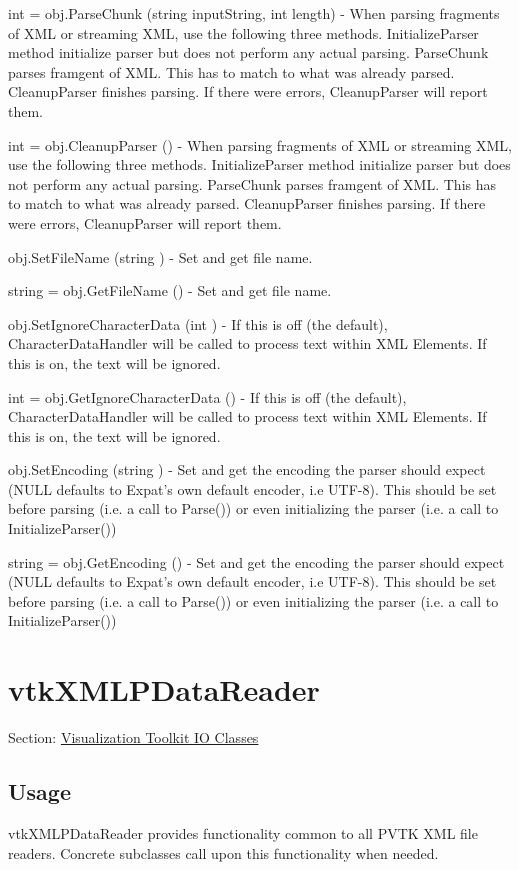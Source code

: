\begin{DoxyItemize}
\item {\ttfamily int = obj.\-Parse\-Chunk (string input\-String, int length)} -\/ When parsing fragments of X\-M\-L or streaming X\-M\-L, use the following three methods. Initialize\-Parser method initialize parser but does not perform any actual parsing. Parse\-Chunk parses framgent of X\-M\-L. This has to match to what was already parsed. Cleanup\-Parser finishes parsing. If there were errors, Cleanup\-Parser will report them.  
\item {\ttfamily int = obj.\-Cleanup\-Parser ()} -\/ When parsing fragments of X\-M\-L or streaming X\-M\-L, use the following three methods. Initialize\-Parser method initialize parser but does not perform any actual parsing. Parse\-Chunk parses framgent of X\-M\-L. This has to match to what was already parsed. Cleanup\-Parser finishes parsing. If there were errors, Cleanup\-Parser will report them.  
\item {\ttfamily obj.\-Set\-File\-Name (string )} -\/ Set and get file name.  
\item {\ttfamily string = obj.\-Get\-File\-Name ()} -\/ Set and get file name.  
\item {\ttfamily obj.\-Set\-Ignore\-Character\-Data (int )} -\/ If this is off (the default), Character\-Data\-Handler will be called to process text within X\-M\-L Elements. If this is on, the text will be ignored.  
\item {\ttfamily int = obj.\-Get\-Ignore\-Character\-Data ()} -\/ If this is off (the default), Character\-Data\-Handler will be called to process text within X\-M\-L Elements. If this is on, the text will be ignored.  
\item {\ttfamily obj.\-Set\-Encoding (string )} -\/ Set and get the encoding the parser should expect (N\-U\-L\-L defaults to Expat's own default encoder, i.\-e U\-T\-F-\/8). This should be set before parsing (i.\-e. a call to Parse()) or even initializing the parser (i.\-e. a call to Initialize\-Parser())  
\item {\ttfamily string = obj.\-Get\-Encoding ()} -\/ Set and get the encoding the parser should expect (N\-U\-L\-L defaults to Expat's own default encoder, i.\-e U\-T\-F-\/8). This should be set before parsing (i.\-e. a call to Parse()) or even initializing the parser (i.\-e. a call to Initialize\-Parser())  
\end{DoxyItemize}\hypertarget{vtkio_vtkxmlpdatareader}{}\section{vtk\-X\-M\-L\-P\-Data\-Reader}\label{vtkio_vtkxmlpdatareader}
Section\-: \hyperlink{sec_vtkio}{Visualization Toolkit I\-O Classes} \hypertarget{vtkwidgets_vtkxyplotwidget_Usage}{}\subsection{Usage}\label{vtkwidgets_vtkxyplotwidget_Usage}
vtk\-X\-M\-L\-P\-Data\-Reader provides functionality common to all P\-V\-T\-K X\-M\-L file readers. Concrete subclasses call upon this functionality when needed.

